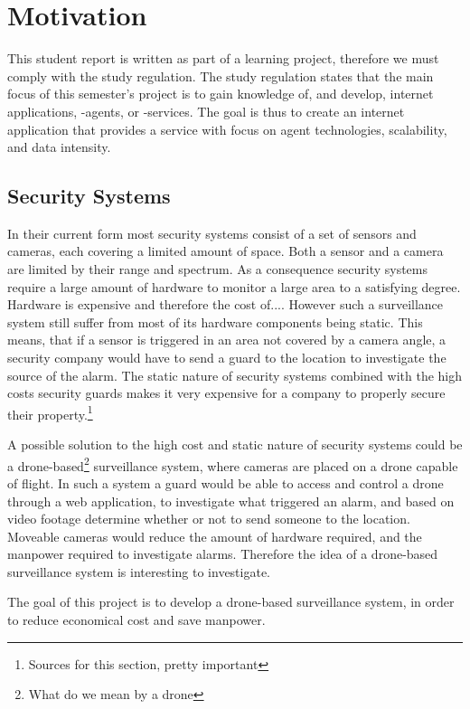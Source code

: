 \section{Motivation}
This student report is written as part of a learning project, therefore we must comply with the study regulation.
The study regulation states that the main focus of this semester's project is to gain knowledge of, and develop, internet applications, -agents, or -services.
The goal is thus to create an internet application that provides a service with focus on agent technologies, scalability, and data intensity.

\subsection{Security Systems}
In their current form most security systems consist of a set of sensors and cameras, each covering a limited amount of space.
Both a sensor and a camera are limited by their range and spectrum.
As a consequence security systems require a large amount of hardware to monitor a large area to a satisfying degree.
Hardware is expensive and therefore the cost of....
However such a surveillance system still suffer from most of its hardware components being static.
This means, that if a sensor is triggered in an area not covered by a camera angle, a security company would have to send a guard to the location to investigate the source of the alarm.
The static nature of security systems combined with the high costs security guards makes it very expensive for a company to properly secure their property.\footnote{Sources for this section, pretty important}

A possible solution to the high cost and static nature of security systems could be a drone-based\footnote{What do we mean by a drone} surveillance system, where cameras are placed on a drone capable of flight.
In such a system a guard would be able to access and control a drone through a web application, to investigate what triggered an alarm, and based on video footage determine whether or not to send someone to the location.
Moveable cameras would reduce the amount of hardware required, and the manpower required to investigate alarms.
Therefore the idea of a drone-based surveillance system is interesting to investigate.

The goal of this project is to develop a drone-based surveillance system, in order to reduce economical cost and save manpower.



